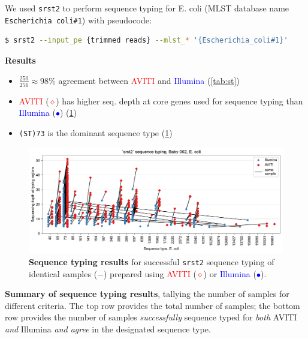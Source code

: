 \documentclass{article}
\begin{document}
We used \texttt{srst2} to perform sequence typing for E. coli (MLST database name \texttt{Escherichia coli\#1}) with pseudocode:

\begin{lstlisting}[language=bash]
$ srst2 --input_pe {trimmed reads} --mlst_* '{Escherichia_coli#1}'
\end{lstlisting}

\textbf{Results}

\begin{itemize}
    \item $\frac{250}{256} \approx 98\%$ agreement between \textcolor{red}{AVITI} and \textcolor{blue}{Illumina} (\cref{tab:st})
    \item \textcolor{red}{AVITI} (\textcolor{red}{$\diamond$}) has higher seq. depth at core genes used for sequence typing than \textcolor{blue}{Illumina} (\textcolor{blue}{$\bullet$}) (\cref{figure:st})
    \item \texttt{(ST)73} is the dominant sequence type (\cref{figure:st})
\end{itemize}

\begin{figure}[H]
    \centering
    \includegraphics[width=.95\textwidth]{figures/sequence_typing.pdf}
    \caption{
        \textbf{Sequence typing results} for successful \texttt{srst2} sequence typing of identical samples ($-$) 
        prepared using \textcolor{red}{AVITI} (\textcolor{red}{$\diamond$}) or \textcolor{blue}{Illumina} (\textcolor{blue}{$\bullet$}).
    }
    \label{figure:st}
\end{figure}

\begin{table}[H]
    \centering
    
    \caption{
        \textbf{Summary of sequence typing results}, tallying the number of samples for different criteria. 
        The top row provides the total number of samples; 
        the bottom row provides the number of samples \textit{successfully} sequence typed for \textit{both} AVITI \textit{and} Illumina 
        \textit{and agree} in the designated sequence type.
    }
    \label{tab:st}
\end{table}
\end{document}
